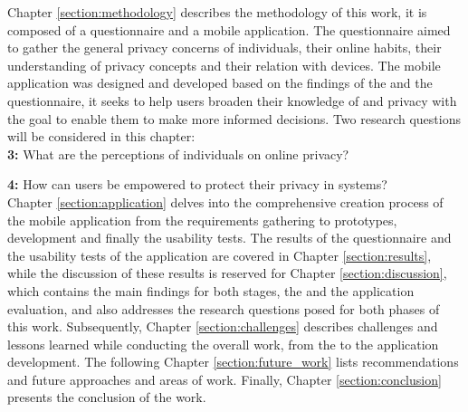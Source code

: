 Chapter \ref{section:methodology} describes the methodology of this work, it is composed of a
questionnaire and a mobile application. The questionnaire aimed to gather
the general privacy concerns of individuals, their online habits, their
understanding of privacy concepts and their relation with \hyperlink{\acronym}{\acronym} devices.
The mobile application was designed and developed based on the findings
of the \hyperlink{\acronym}{\acronym} and the questionnaire, it seeks to help users broaden their
knowledge of \hyperlink{\acronym}{\acronym} and privacy with the goal to enable them to make more
informed decisions. Two research questions will be considered in this
chapter:\\


\textbf{\hyperlink{\acronym}{\acronym}3:} What are the perceptions of individuals on online privacy?

\textbf{\hyperlink{\acronym}{\acronym}4:} How can users be empowered to protect their privacy in \hyperlink{\acronym}{\acronym} systems?\\

Chapter \ref{section:application} delves into the comprehensive creation process
of the mobile application from the requirements gathering to prototypes, development
and finally the usability tests.
The results of the questionnaire and the usability tests of the application are
covered in Chapter \ref{section:results}, while the discussion of these results is reserved for
Chapter \ref{section:discussion}, which contains the main findings for both stages, the \hyperlink{\acronym}{\acronym} and the
application evaluation, and also addresses the research questions posed for both phases of
this work. Subsequently, Chapter \ref{section:challenges} describes challenges and lessons
learned while conducting the overall work, from the \hyperlink{\acronym}{\acronym} to the application
development. The following Chapter \ref{section:future_work} lists recommendations and future approaches and areas of work.
Finally, Chapter \ref{section:conclusion} presents the conclusion of the work.
